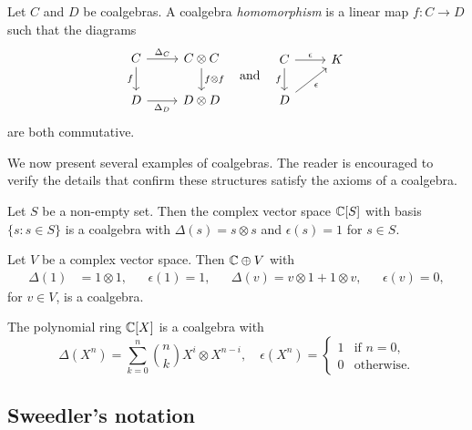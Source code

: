 \documentclass[12pt]{amsproc}
\begin{document}
\begin{definition}
Let $C$ and $D$ be coalgebras. A coalgebra \emph{homomorphism}
is a linear map $f\colon C\to D$ such that 
the diagrams 
\[
\begin{tikzcd}
C \arrow[r, "\Delta_C"] \arrow[d, "f"'] & C \otimes C \arrow[d, "f \otimes f"] \\
D \arrow[r, "\Delta_D"'] & D \otimes D
\end{tikzcd}
\quad\text{and}\quad 
\begin{tikzcd}
C \arrow[r, "\epsilon"] \arrow[d, "f"'] & K \\
D \arrow[ur, "\epsilon"'] 
\end{tikzcd}
\]
are both commutative. 
\end{definition}

We now present several examples of coalgebras.
The reader is encouraged to verify the details that confirm these structures satisfy the axioms of a coalgebra.

\begin{example}
    Let $S$ be a non-empty set. Then the complex vector space $\mathbb{C}[S]$ with basis $\{s:s\in S\}$ is a coalgebra
    with $\Delta(s)=s\otimes s$ and 
    $\epsilon(s)=1$ for $s\in S$.
\end{example}

\begin{example}
    Let $V$ be a complex vector space. Then 
    $\mathbb{C}\oplus V$ with 
    \begin{align*}
        \Delta(1)&=1\otimes 1, && 
        \epsilon(1)=1, &&
        \Delta(v)=v\otimes 1+1\otimes v, && 
        \epsilon(v)=0,
    \end{align*}
    for $v\in V$, is a coalgebra. 
\end{example}

\begin{example}
    The polynomial ring $\mathbb{C}[X]$ is a coalgebra
    with 
    \[
    \Delta(X^n)=\sum_{k=0}^n\binom{n}{k}X^i\otimes X^{n-i},\quad \epsilon(X^n)=\begin{cases}
        1 & \text{if $n=0$,}\\
        0 & \text{otherwise.}
    \end{cases}
    \]
\end{example}
    

\subsection{Sweedler's notation}
\end{document}
